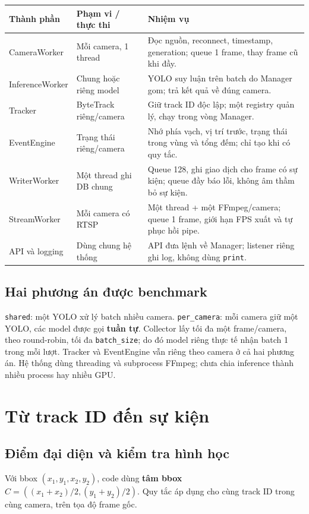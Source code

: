 \documentclass[10pt,a4paper]{article}
\newcommand{\shared}{\texttt{shared}}
\newcommand{\percam}{\texttt{per\_camera}}
\begin{document}
\begin{tabularx}{\linewidth}{@{}p{3.05cm}p{3.3cm}Y@{}}
\toprule
\textbf{Thành phần} & \textbf{Phạm vi / thực thi} & \textbf{Nhiệm vụ}\\
\midrule
CameraWorker & Mỗi camera, 1 thread & Đọc nguồn, reconnect, timestamp,
generation; queue 1 frame, thay frame cũ khi đầy.\\
InferenceWorker & Chung hoặc riêng model & YOLO suy luận trên batch do Manager gom;
trả kết quả về đúng camera.\\
Tracker & ByteTrack riêng/camera & Giữ track ID độc lập; một registry quản lý,
chạy trong vòng Manager.\\
EventEngine & Trạng thái riêng/camera & Nhớ phía vạch, vị trí trước, trạng thái
trong vùng và tổng đếm; chỉ tạo khi có quy tắc.\\
WriterWorker & Một thread ghi DB chung & Queue 128, ghi giao dịch cho frame có
sự kiện; queue đầy báo lỗi, không âm thầm bỏ sự kiện.\\
StreamWorker & Mỗi camera có RTSP & Một thread + một FFmpeg/camera; queue 1 frame,
giới hạn FPS xuất và tự phục hồi pipe.\\
API và logging & Dùng chung hệ thống & API đưa lệnh về Manager; listener riêng
ghi log, không dùng \texttt{print}.\\
\bottomrule
\end{tabularx}

\subsection*{Hai phương án được benchmark}
\shared{}: một YOLO xử lý batch nhiều camera.
\percam{}: mỗi camera giữ một YOLO, các model được gọi \textbf{tuần tự}.
Collector lấy tối đa một frame/camera, theo round-robin, tối đa
\texttt{batch\_size}; do đó model riêng thực tế nhận batch 1 trong mỗi lượt.
Tracker và EventEngine vẫn riêng theo camera ở cả hai phương án.
Hệ thống dùng threading và subprocess FFmpeg; chưa chia inference thành nhiều
process hay nhiều GPU.

\newpage
\section{Từ track ID đến sự kiện}
\subsection*{Điểm đại diện và kiểm tra hình học}
Với bbox $(x_1,y_1,x_2,y_2)$, code dùng \textbf{tâm bbox}
$C=((x_1+x_2)/2,(y_1+y_2)/2)$.
Quy tắc áp dụng cho cùng track ID trong cùng camera, trên tọa độ frame gốc.
\end{document}
